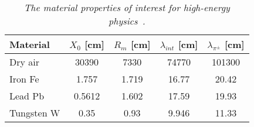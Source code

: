         \begin{table}[H]
        \begin{center}
        \begin{tabular}{l c c c c}
        \hline
	Material & $X_0$ [cm] & $R_m$ [cm] &  $\lambda_{int}$ [cm] & $\lambda_{\pi^{\pm}}$ [cm]  \\
	\hline
	Dry air  & 30390 & 7330 & 74770 & 101300 \\
	Iron Fe  & 1.757 & 1.719 & 16.77 & 20.42 \\
	Lead  Pb & 0.5612 & 1.602 & 17.59 & 19.93 \\
	Tungsten W &0.35&0.93& 9.946 & 11.33 \\ 
        \hline
        \end{tabular}
        \end{center}
        \caption{\sl The material properties of interest for high-energy physics~\cite{bib:PDGprop}. }
        \label{table:material}
        \end{table}
